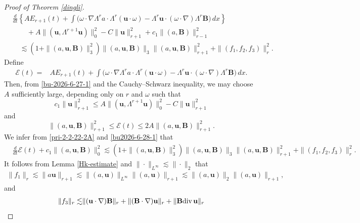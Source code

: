 \documentclass[10pt,a4paper]{amsart}
\def\b{ \mathbf{B} }
\def\div{ \hbox{\rm div}\,  }
\def\u{ \mathbf{u} }
\begin{document}
\begin{proof}[Proof of Theorem \ref{dingli}]
\begin{equation}
\begin{split}
&\frac{d}{dt}\left\{AE_{r+1}(t)+\int \Big(\omega\cdot\nabla\Lambda^{r}a\cdot\Lambda^{r}(\u\cdot\omega)-\Lambda^{r}\u\cdot(\omega\cdot\nabla)\Lambda^{r}\b\Big) \,dx\right\}\\
&\quad\quad+A\|(\u,\Lambda^{r+1}\u)\|_{0}^2-C\|\u\|_{r+1}^2+c_1\|(a,\b)\|_{r-1}^2\\
&\quad\lesssim (1+\|(a,\u,\b)\|^2_3)\|(a,\u,\b)\|_3\|(a,\u,\b)\|^2_{r+1}+\|(f_1,f_2,f_3)\|_{r}^{2}.
\end{split}\end{equation}
Define
\begin{align*}%
{\mathcal{E}(t)}=&AE_{r+1}(t)+\int \Big(\omega\cdot\nabla\Lambda^{r}a\cdot\Lambda^{r}(\u\cdot\omega)-\Lambda^{r}\u\cdot(\omega\cdot\nabla)\Lambda^{r}\b\Big) \,dx.
\end{align*}
Then, from \eqref{bu-2026-6-27-1} and the
Cauchy--Schwarz inequality,  we may choose $A$ sufficiently large, depending only on $r$ and $\omega$ such that
\begin{equation}\label{bu2026-6-28-1}c_1\|\u\|_{r+1}^2\leq A\|(\u,\Lambda^{r+1}\u)\|_{0}^2-C\|\u\|^2_{r+1}
\end{equation} and
\begin{equation}\label{bu2026-6-28-2}
\|(a,\u,\b)\|^2_{r+1}\leq {\mathcal{E}(t)}\leq 2A\|(a,\u,\b)\|^2_{r+1}.
\end{equation}
We infer from \eqref{pri-2-2-22-2A} and \eqref{bu2026-6-28-1} that
\begin{equation}\label{bu-pri-2-2-22-2A}
\begin{split}
&\frac{d}{dt}{\mathcal{E}(t)}+c_1\|(a,\u,\b)\|_{0}^2\lesssim (1+\|(a,\u,\b)\|^2_3)\|(a,\u,\b)\|_3\|(a,\u,\b)\|^2_{r+1}+\|(f_1,f_2,f_3)\|_{r}^{2}.
\end{split}\end{equation}
It follows from Lemma \ref{Hk-estimate} and $\|\cdot\|_{L^\infty}\lesssim\|\cdot\|_2$ that
\begin{equation}\begin{split}\label{4.6AAAA}
\|f_1\|_{r}\lesssim\|a\u\|_{r+1}\lesssim\|(a,\u)\|_{L^\infty}\|(a,\u)\|_{r+1}\lesssim\|(a,\u)\|_{2}\|(a,\u)\|_{r+1},
\end{split}\end{equation}
and
\begin{equation}\begin{split}\label{bu4.7AAAA}
\|f_3\|_{r}\lesssim&\|(\u\cdot\nabla) \b\|_{r}+\|( \b\cdot\nabla)\u\|_{r}+\| \b\div \u\|_{r}\\

\end{split}
\end{equation}
\end{proof}
\end{document}
